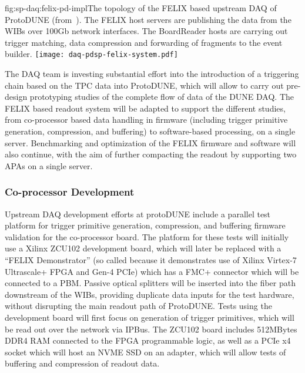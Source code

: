 
\begin{dunefigure}{fig:sp-daq:felix-pd-impl}{The topology of the FELIX based
    upstream DAQ of ProtoDUNE (from~\cite{pdsp-felix}). The FELIX host servers are publishing the data from the WIBs over 100Gb network interfaces. The BoardReader hosts are carrying out trigger matching, data compression and forwarding of fragments to the event builder.}
  \texttt{[image: daq-pdsp-felix-system.pdf]}
\end{dunefigure}

The DAQ team is investing substantial effort into the introduction of
a triggering chain based on the TPC data into ProtoDUNE, which will
allow to carry out pre-design prototyping studies of the complete flow
of data of the DUNE DAQ.  
The FELIX based readout system will be adapted to support the
different studies, from co-processor based data handling in firmware
(including trigger primitive generation, compression, and buffering) to software-based processing, on a single
server. Benchmarking and optimization of the FELIX firmware and
software will also continue, with the aim of further compacting the
readout by supporting two APAs on a single server. 

\subsubsection{Co-processor Development}

Upstream DAQ development efforts at protoDUNE include a parallel test 
platform for trigger
primitive generation, compression, and buffering firmware validation for
the co-processor board.  The platform for these tests will initially
use a Xilinx ZCU102 development board, which will later be replaced
with a ``FELIX Demonstrator'' (so called because it demonstrates use
of Xilinx Virtex-7 Ultrascale+ FPGA and Gen-4 PCIe) which has a FMC+
connector which will be connected to a PBM. Passive optical splitters
will be inserted into the fiber path downstream of the WIBs, providing
duplicate data inputs for the test hardware, without disrupting the
main readout path of ProtoDUNE. Tests using the development board will
first focus on generation of trigger primitives, which will be read
out over the network via IPBus\cite{ref:ipbus}. The ZCU102 board
includes 512MBytes DDR4 RAM connected to the FPGA programmable logic,
as well as a PCIe x4 socket which will host an NVME SSD on an adapter,
which will allow tests of buffering and compression of readout
data. 

